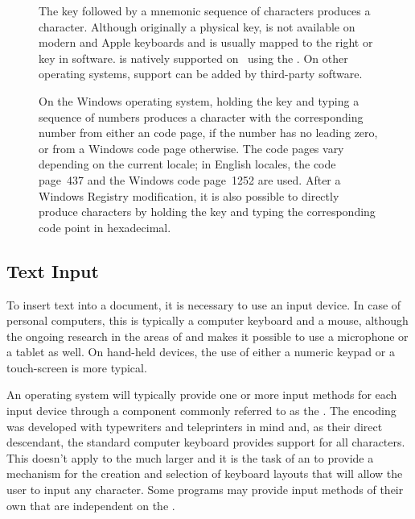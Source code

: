 \begin{figure}[p]
  
  \caption{The  key followed by
    a mnemonic sequence of  characters produces a
     character. Although originally a physical key, 
    is not available on modern  and Apple keyboards and is usually
    mapped to the right  or  key in software.
     is natively supported on \Unices\ using the . On other operating systems, support can be added by third-party
    software.}
\end{figure}

\begin{figure}
  
  \caption{On the Windows operating system, holding the  key and typing
    a sequence of numbers produces a character with the corresponding number
    from either an  code page, if the number has no leading zero,
    or from a Windows code page otherwise. The code pages vary depending on the
    current locale; in English locales, the  code page~437
    and the Windows code page~1252 are used. After a Windows Registry
    modification, it is also possible to directly produce 
    characters by holding the  key and typing the corresponding
     code point in hexadecimal.}
\end{figure}

\subsection{Text Input}
To insert text into a document, it is necessary to use an input device. In case
of personal computers, this is typically a computer keyboard and a mouse,
although the ongoing research in the areas of  and 
makes it possible to use a microphone or a tablet as well. On hand-held devices,
the use of either a numeric keypad or a touch-screen is more typical.

An operating system will typically provide one or more input methods for each
input device through a component commonly referred to as the . The
 encoding was developed with typewriters and teleprinters in
mind and, as their direct descendant, the standard computer keyboard provides
support for all  characters. This doesn't apply to the much
larger  and it is the task of an  to provide a
mechanism for the creation and selection of keyboard layouts that will allow the
user to input any  character. Some programs may provide input
methods of their own that are independent on the .

